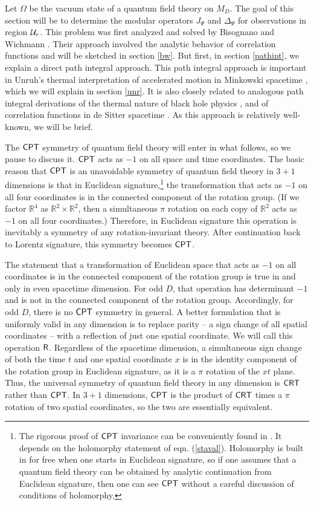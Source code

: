 \documentclass[12pt]{article}
\def\Bbb{\mathbb}
\def\CPT{\sf{CPT}}
\def\CRT{{\sf{CRT}}}
\def\R{{\Bbb{R}}}\def\Z{{\Bbb{Z}}}
\def\RR{{\sf R}}
\numberwithin{equation}{section}
\def\Z{{\Bbb Z}}
\begin{document}
Let $\Omega$ be the vacuum state of a quantum field theory on $M_D$.
The goal of this section will be to determine the modular operators $J_\Psi$ and $\Delta_\Psi$ for observations in region ${\mathcal U}_r$.
This problem was first analyzed and solved
 by Bisognano and Wichmann \cite{BiWi}.  Their approach involved the analytic behavior of correlation
functions and will be sketched in section \ref{bw}.    But first, in section \ref{pathint},
we explain a direct path integral approach.  This path integral approach is important in Unruh's thermal interpretation of accelerated motion in Minkowski spacetime
\cite{Unruh}, which we will explain in section \ref{unr}.  It is also closely related to analogous path integral derivations of the thermal
nature of black hole physics \cite{Hawking}, \cite{GibbonsHawking} and of correlation functions in de Sitter spacetime \cite{MoreGibbonsHawking,FHN}.
As this approach is relatively well-known,  we will be brief.

 The $\CPT$ symmetry of quantum field theory will enter in what follows, so we pause to discuss it.
$\CPT$ acts as $-1$ on all  space and time coordinates.
The basic reason that $\CPT$ is an unavoidable 
 symmetry of quantum field theory in $3+1$ dimensions is that in Euclidean signature,\footnote{The
rigorous proof of $\CPT$ invariance can be conveniently found in \cite{StW}.   It depends on the holomorphy statement
of eqn. (\ref{staval}).   Holomorphy is built in for free when one starts in Euclidean
signature, so if one assumes that a quantum field theory can be obtained by analytic continuation from Euclidean signature,
then one can see $\CPT$ without a careful discussion of conditions of holomorphy.} the transformation
that acts as $-1$ on all four 
coordinates is in the connected component of the rotation group. (If we factor $\R^4$ as $\R^2\times \R^2$, then a simultaneous
$\pi$ rotation on each copy of $\R^2$ acts as $-1$ on all four coordinates.)   Therefore,  in Euclidean
signature this operation is inevitably a symmetry of any rotation-invariant theory.  After continuation back to Lorentz signature, this symmetry becomes $\CPT$.  

The statement that a transformation of Euclidean space that acts as $-1$ on all coordinates is in the connected component of the rotation
group is true in and only in even spacetime dimension.  For odd $D$, that operation has determinant $-1$ and is not in the connected
component of the rotation group.   Accordingly, for odd $D$, there is no $\CPT$ symmetry in general.  A better formulation that
is uniformly valid in any dimension is to replace parity -- a sign change of all spatial coordinates -- with a reflection of just one spatial
coordinate.  We will call this operation $\RR$.  Regardless of the spacetime dimension, a
 simultaneous sign change of both the time $t$ and one spatial coordinate
$x$ is  
in the identity component of the rotation group in Euclidean signature, as it is a $\pi$ rotation of the $xt$ plane.  Thus, the universal
symmetry of quantum field theory in any dimension is $\CRT$ rather than $\CPT$.  In $3+1$ dimensions, $\CPT$ is the product of $\CRT$
times a $\pi$ rotation of two spatial coordinates, so the two are essentially equivalent.
\end{document}
